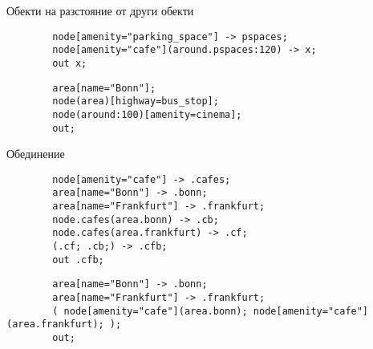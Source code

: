 \documentclass[9pt]{beamer}
\begin{document}
  \begin{frame}[fragile]{Обекти на разстояние от други обекти}
    \begin{lstwrap}\begin{lstlisting}
        node[amenity="parking_space"] -> pspaces;
        node[amenity="cafe"](around.pspaces:120) -> x;
        out x;
    \end{lstlisting}\end{lstwrap}
    \begin{lstwrap}\begin{lstlisting}
        area[name="Bonn"];
        node(area)[highway=bus_stop];
        node(around:100)[amenity=cinema];
        out;
    \end{lstlisting}\end{lstwrap}
  \end{frame}

  \begin{frame}[fragile]{Обединение}
    \begin{lstwrap}\begin{lstlisting}
        node[amenity="cafe"] -> .cafes;
        area[name="Bonn"] -> .bonn;
        area[name="Frankfurt"] -> .frankfurt;
        node.cafes(area.bonn) -> .cb;
        node.cafes(area.frankfurt) -> .cf;
        (.cf; .cb;) -> .cfb;
        out .cfb;
    \end{lstlisting}\end{lstwrap}

    \begin{lstwrap}\begin{lstlisting}
        area[name="Bonn"] -> .bonn;
        area[name="Frankfurt"] -> .frankfurt;
        ( node[amenity="cafe"](area.bonn); node[amenity="cafe"](area.frankfurt); );
        out;
    \end{lstlisting}\end{lstwrap}
  \end{frame}
\end{document}
